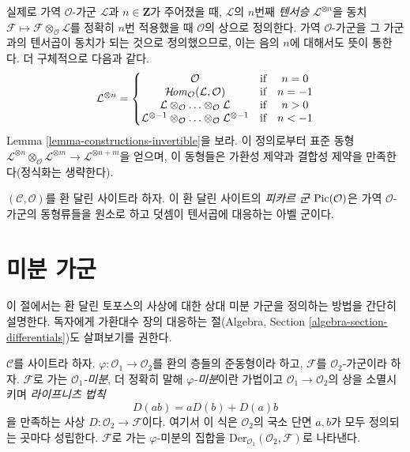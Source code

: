 \medskip\noindent
실제로 가역 $\mathcal{O}$-가군 $\mathcal{L}$과 $n \in \mathbf{Z}$가 주어졌을
때, $\mathcal{L}$의 $n$번째 {\it 텐서승} $\mathcal{L}^{\otimes n}$을 동치
$\mathcal{F} \mapsto \mathcal{F} \otimes_\mathcal{O} \mathcal{L}$를 정확히
$n$번 적용했을 때 $\mathcal{O}$의 상으로 정의한다. 가역 $\mathcal{O}$-가군을
그 가군과의 텐서곱이 동치가 되는 것으로 정의했으므로, 이는 음의 $n$에
대해서도 뜻이 통한다. 더 구체적으로 다음과 같다.
$$
\mathcal{L}^{\otimes n} =
\left\{
\begin{matrix}
\mathcal{O} & \text{if} & n = 0 \\
\mathop{\mathcal{H}\!\mathit{om}}\nolimits_\mathcal{O}(\mathcal{L}, \mathcal{O}) & \text{if} & n = -1\\
\mathcal{L} \otimes_\mathcal{O} \ldots \otimes_\mathcal{O} \mathcal{L}
& \text{if} & n > 0 \\
\mathcal{L}^{\otimes -1} \otimes_\mathcal{O} \ldots
\otimes_\mathcal{O} \mathcal{L}^{\otimes -1}
& \text{if} & n < -1
\end{matrix}
\right.
$$
Lemma \ref{lemma-constructions-invertible}을 보라. 이 정의로부터 표준 동형
$\mathcal{L}^{\otimes n} \otimes_\mathcal{O}
\mathcal{L}^{\otimes m} \to
\mathcal{L}^{\otimes n + m}$을 얻으며, 이 동형들은 가환성 제약과 결합성
제약을 만족한다(정식화는 생략한다).

\begin{definition}
\label{definition-pic}
$(\mathcal{C}, \mathcal{O})$를 환 달린 사이트라 하자. 이 환 달린 사이트의
{\it 피카르 군} $\mathop{\mathrm{Pic}}\nolimits(\mathcal{O})$은 가역 $\mathcal{O}$-가군의 동형류들을
원소로 하고 덧셈이 텐서곱에 대응하는 아벨 군이다.
\end{definition}









\section{미분 가군}
\label{section-differentials}

\noindent
이 절에서는 환 달린 토포스의 사상에 대한 상대 미분 가군을 정의하는 방법을
간단히 설명한다. 독자에게 가환대수 장의 대응하는 절(Algebra, Section
\ref{algebra-section-differentials})도 살펴보기를 권한다.

\begin{definition}
\label{definition-derivation}
$\mathcal{C}$를 사이트라 하자. $\varphi : \mathcal{O}_1 \to \mathcal{O}_2$를
환의 층들의 준동형이라 하고, $\mathcal{F}$를 $\mathcal{O}_2$-가군이라 하자.
$\mathcal{F}$로 가는 {\it $\mathcal{O}_1$-미분}, 더 정확히 말해
{\it $\varphi$-미분}이란 가법이고 $\mathcal{O}_1 \to \mathcal{O}_2$의 상을
소멸시키며 {\it 라이프니츠 법칙}
$$
D(ab) = aD(b) + D(a)b
$$
을 만족하는 사상 $D : \mathcal{O}_2 \to \mathcal{F}$이다. 여기서 이 식은
$\mathcal{O}_2$의 국소 단면 $a, b$가 모두 정의되는 곳마다 성립한다.
$\mathcal{F}$로 가는 $\varphi$-미분의 집합을
$\text{Der}_{\mathcal{O}_1}(\mathcal{O}_2, \mathcal{F})$로 나타낸다.
\end{definition}

